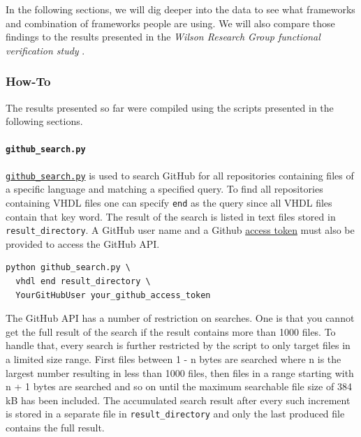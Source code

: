 \documentclass[]{article}
\let\oldparagraph\paragraph
\renewcommand{\paragraph}[1]{\oldparagraph{#1}\mbox{}}
\begin{document}
In the following sections, we will dig deeper into the data to see what frameworks and combination of frameworks people are using. We will also compare those findings to the results presented in the \emph{Wilson Research Group functional verification study} \autocite{wilson18}.

\hypertarget{repos-howto}{%
\subsubsection{How-To}\label{repos-howto}}

The results presented so far were compiled using the scripts presented in the following sections.

\hypertarget{github-search}{%
\paragraph{\texorpdfstring{\texttt{github\_search.py}}{github\_search.py}}\label{github-search}}

\href{https://github.com/LarsAsplund/github-facts/tree/main/py/github_search.py}{\texttt{github\_search.py}} is used to search GitHub for all repositories containing files of a specific language and matching a specified query. To find all repositories containing VHDL files one can specify \texttt{end} as the query since all VHDL files contain that key word. The result of the search is listed in text files stored in \texttt{result\_directory}. A GitHub user name and a Github \href{https://help.github.com/en/github/authenticating-to-github/creating-a-personal-access-token-for-the-command-line}{access token} must also be provided to access the GitHub API.

\begin{verbatim}
python github_search.py \
  vhdl end result_directory \
  YourGitHubUser your_github_access_token
\end{verbatim}

The GitHub API has a number of restriction on searches. One is that you cannot get the full result of the search if the result contains more than 1000 files. To handle that, every search is further restricted by the script to only target files in a limited size range. First files between 1 - n bytes are searched where n is the largest number resulting in less than 1000 files, then files in a range starting with n + 1 bytes are searched and so on until the maximum searchable file size of 384 kB has been included. The accumulated search result after every such increment is stored in a separate file in \texttt{result\_directory} and only the last produced file contains the full result.
\end{document}
